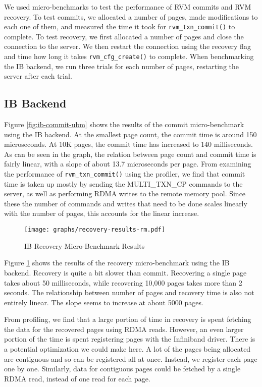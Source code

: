 
We used micro-benchmarks to test the performance of RVM commits and RVM
recovery. To test commits, we allocated a number of pages, made modifications
to each one of them, and measured the time it took for \verb|rvm_txn_commit()|
to complete. To test recovery, we first allocated a number of pages and
close the connection to the server. We then restart the connection using the
recovery flag and time how long it takes \verb|rvm_cfg_create()| to complete.
When benchmarking the IB backend, we run three trials for each number of pages,
restarting the server after each trial.

\subsection{IB Backend}
Figure \ref{fig:ib-commit-ubm} shows the results of the commit micro-benchmark
using the IB backend. At the smallest page count, the commit time is around
150 microseconds. At 10K pages, the commit time has increased to 140 milliseconds.
As can be seen in the graph, the relation between page count and commit time
is fairly linear, with a slope of about 13.7 microseconds per page.
From examining the performance of \verb|rvm_txn_commit()| using the profiler,
we find that commit time is taken up mostly by sending the MULTI\_TXN\_CP
commands to the server, as well as performing RDMA writes to the remote memory
pool.  Since these the number of commands and writes that need to be done
scales linearly with the number of pages, this accounts for the linear
increase.

\begin{figure}[t!]
    \caption{IB Recovery Micro-Benchmark Results}
    \texttt{[image: graphs/recovery-results-rm.pdf]}
    \label{fig:ib-recovery-ubm}
\end{figure}

Figure \ref{fig:ib-recovery-ubm} shows the results of the recovery
micro-benchmark using the IB backend. Recovery is quite a bit slower than
commit. Recovering a single page takes about 50 milliseconds, while recovering
10,000 pages takes more than 2 seconds. The relationship between number of
pages and recovery time is also not entirely linear. The slope seems to
increase at about 5000 pages.

From profiling, we find that a large portion of time in recovery is spent
fetching the data for the recovered pages using RDMA reads. However, an even
larger portion of the time is spent registering pages with the Infiniband
driver. There is a potential optimization we could make here. A lot of the
pages being allocated are contiguous and so can be registered all at once.
Instead, we register each page one by one. Similarly, data for contiguous
pages could be fetched by a single RDMA read, instead of one read for each page.

